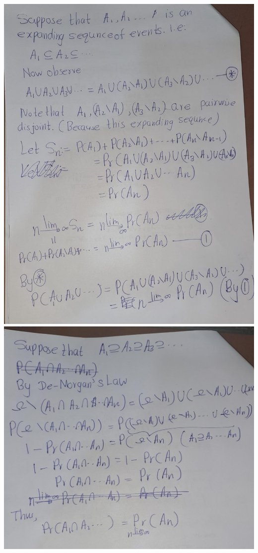 \documentclass[
]{book}
\theoremstyle{definition}
\theoremstyle{definition}
\theoremstyle{definition}
\theoremstyle{definition}
\theoremstyle{remark}
\begin{document}
\includegraphics[width=18cm,height=\textheight]{fig/fig1.jpg}
\includegraphics[width=18cm,height=\textheight]{fig/fig2.jpg}
\end{document}
